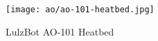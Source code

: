 
\begin{figure}[h!]
\texttt{[image: ao/ao-101-heatbed.jpg]}
 \caption{LulzBot AO-101 Heatbed}
 \label{fig:ao-101-heatbed}
\end{figure}



